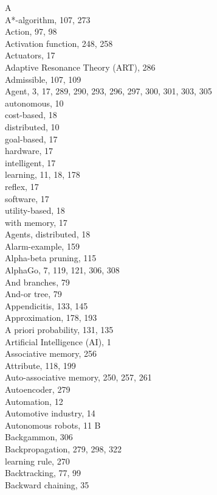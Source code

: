 \documentclass[10pt]{book}
\begin{document}
A\\
A*-algorithm, 107, 273\\
Action, 97, 98\\
Activation function, 248, 258\\
Actuators, 17\\
Adaptive Resonance Theory (ART), 286\\
Admissible, 107, 109\\
Agent, 3, 17, 289, 290, 293, 296, 297, 300, 301, 303, 305\\
autonomous, 10\\
cost-based, 18\\
distributed, 10\\
goal-based, 17\\
hardware, 17\\
intelligent, 17\\
learning, 11, 18, 178\\
reflex, 17\\
software, 17\\
utility-based, 18\\
with memory, 17\\
Agents, distributed, 18\\
Alarm-example, 159\\
Alpha-beta pruning, 115\\
AlphaGo, 7, 119, 121, 306, 308\\
And branches, 79\\
And-or tree, 79\\
Appendicitis, 133, 145\\
Approximation, 178, 193\\
A priori probability, 131, 135\\
Artificial Intelligence (AI), 1\\
Associative memory, 256\\
Attribute, 118, 199\\
Auto-associative memory, 250, 257, 261\\
Autoencoder, 279\\
Automation, 12\\
Automotive industry, 14\\
Autonomous robots, 11
B\\
Backgammon, 306\\
Backpropagation, 279, 298, 322\\
learning rule, 270\\
Backtracking, 77, 99\\
Backward chaining, 35\\
\end{document}
